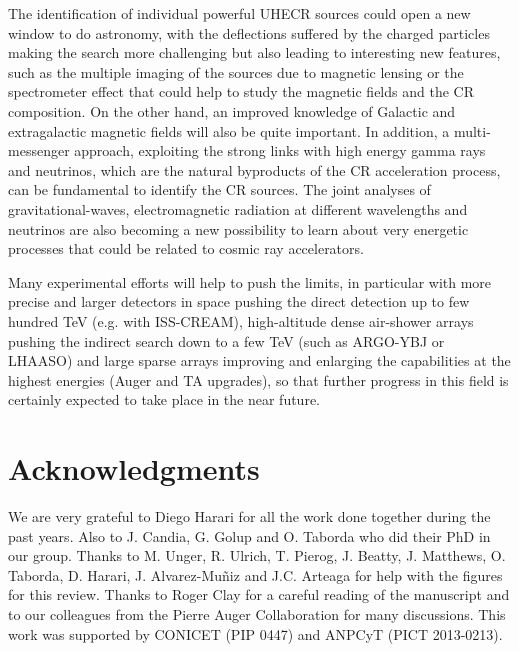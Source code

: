 \documentclass[twoside,12pt]{article}
\begin{document}
The identification of  individual powerful UHECR sources could open a new window to do astronomy, with the deflections suffered by the charged particles making the search more challenging but also leading to interesting new features, such as the multiple imaging of the sources due to magnetic lensing or the spectrometer effect that could help to study the magnetic fields and the CR composition. On the other hand, an improved knowledge of Galactic and extragalactic magnetic fields will also be quite important. In addition, a multi-messenger approach, exploiting the strong links with high energy gamma rays and neutrinos, which are the natural byproducts of the CR acceleration process, can be fundamental to identify the CR sources. The joint analyses of gravitational-waves, electromagnetic radiation at different wavelengths and neutrinos are also becoming a new possibility to learn about very energetic processes that could be related to cosmic ray accelerators.

Many experimental efforts will help to push the limits, in particular with more precise and larger detectors in space pushing the direct detection up to few hundred TeV (e.g. with ISS-CREAM), high-altitude dense air-shower arrays pushing the indirect search down to a few TeV (such as ARGO-YBJ or LHAASO) and large sparse arrays improving and enlarging the capabilities at the highest energies (Auger and TA upgrades), so that further progress in this field is certainly expected to take place in the near future.



\section*{Acknowledgments}
We are very grateful to Diego Harari for all the work done together during the past years. Also to J. Candia, G. Golup and O. Taborda who did their PhD in our group. Thanks to M. Unger, R. Ulrich, T. Pierog, J. Beatty, J. Matthews, O. Taborda, D. Harari, J. Alvarez-Mu\~niz and J.C. Arteaga for help with the figures for this review. Thanks to Roger Clay for a careful reading of the manuscript and to our colleagues from the Pierre Auger Collaboration for many discussions.
This work was supported by CONICET (PIP 0447) and ANPCyT (PICT 2013-0213).
\end{document}
